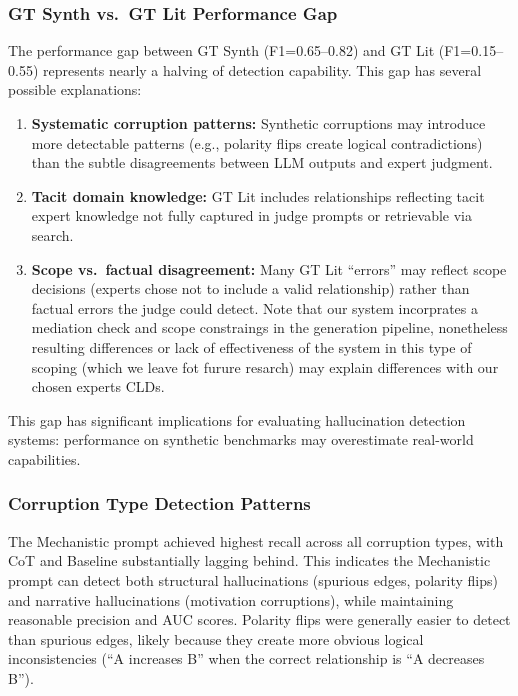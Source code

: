 \subsubsection{GT Synth vs.\ GT Lit Performance Gap}

The performance gap between GT Synth (F1=0.65--0.82) and GT Lit (F1=0.15--0.55) represents nearly a halving of detection capability. This gap has several possible explanations:

\begin{enumerate}[noitemsep]
    \item \textbf{Systematic corruption patterns:} Synthetic corruptions may introduce more detectable patterns (e.g., polarity flips create logical contradictions) than the subtle disagreements between LLM outputs and expert judgment.
    \item \textbf{Tacit domain knowledge:} GT Lit includes relationships reflecting tacit expert knowledge not fully captured in judge prompts or retrievable via search.
    \item \textbf{Scope vs.\ factual disagreement:} Many GT Lit ``errors'' may reflect scope decisions (experts chose not to include a valid relationship) rather than factual errors the judge could detect. Note that our system incorprates a mediation check and scope constraings in the generation pipeline, nonetheless resulting differences or lack of effectiveness of the system in this type of scoping (which we leave fot furure resarch) may explain differences with our chosen experts CLDs.
\end{enumerate}

This gap has significant implications for evaluating hallucination detection systems: performance on synthetic benchmarks may overestimate real-world capabilities.

\subsubsection{Corruption Type Detection Patterns}

The Mechanistic prompt achieved highest recall across all corruption types, with CoT and Baseline substantially lagging behind. This indicates the Mechanistic prompt can detect both structural hallucinations (spurious edges, polarity flips) and narrative hallucinations (motivation corruptions), while maintaining reasonable precision and AUC scores. Polarity flips were generally easier to detect than spurious edges, likely because they create more obvious logical inconsistencies (``A increases B'' when the correct relationship is ``A decreases B'').

